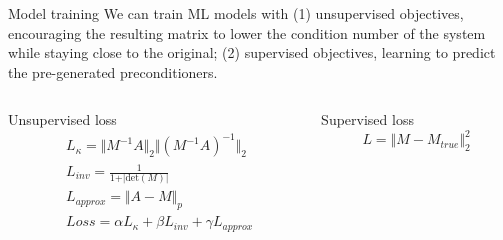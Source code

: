 \documentclass[aspectratio=169]{beamer}
\begin{document}
\begin{frame}{Model training}
   We can train ML models with (1) unsupervised objectives, encouraging the resulting matrix to lower the condition number of the system while staying close to the original; (2) supervised objectives, learning to predict the pre-generated preconditioners. 
   \vspace{1em}
   \begin{columns}
        \begin{column}[t]{.5\textwidth}
            Unsupervised loss
            \begin{equation}
                \begin{aligned}
                    &L_{\kappa} = \Vert M^{-1}A \Vert_2 \Vert (M^{-1}A)^{-1}\Vert_2\\
                    &L_{inv} = \frac{1}{1 + \vert \text{det}(M)\vert}\\
                    &L_{approx}  = \Vert A - M \Vert_p\\
                    &Loss = \alpha L_{\kappa} + \beta L_{inv} + \gamma L_{approx}
                \end{aligned}
            \end{equation}
        \end{column}
        \begin{column}[t]{.5\textwidth}
            Supervised loss
            \begin{equation}
                L = \Vert M - M_{true}\Vert_2^2
            \end{equation}
            
        \end{column}
   \end{columns}
\end{frame}
\end{document}
